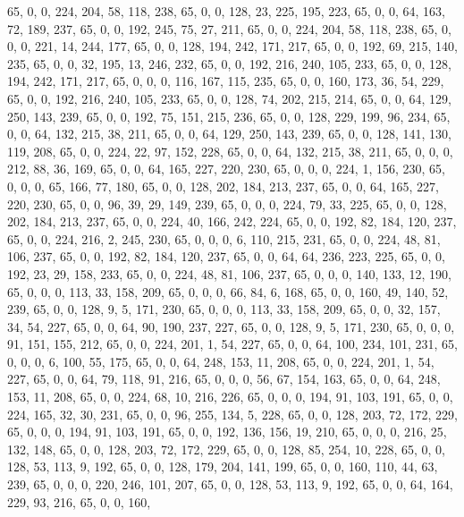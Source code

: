 \begin{DoxyCode}
       65, 0, 0, 224, 204, 58, 118, 238, 65, 0, 0, 128, 23, 225, 195, 223, 65, 0, 0, 64, 163, 72, 189, 237, 65, 0,
       0, 192, 245, 75, 27, 211, 65, 0, 0, 224, 204, 58, 118, 238, 65, 0, 0, 0, 221, 14, 244, 177, 65, 0, 0, 128,
       194, 242, 171, 217, 65, 0, 0, 192, 69, 215, 140, 235, 65, 0, 0, 32, 195, 13, 246, 232, 65, 0, 0, 192, 216,
       240, 105, 233, 65, 0, 0, 128, 194, 242, 171, 217, 65, 0, 0, 0, 116, 167, 115, 235, 65, 0, 0, 160, 173, 36, 54,
       229, 65, 0, 0, 192, 216, 240, 105, 233, 65, 0, 0, 128, 74, 202, 215, 214, 65, 0, 0, 64, 129, 250, 143, 239,
       65, 0, 0, 192, 75, 151, 215, 236, 65, 0, 0, 128, 229, 199, 96, 234, 65, 0, 0, 64, 132, 215, 38, 211, 65, 0,
       0, 64, 129, 250, 143, 239, 65, 0, 0, 128, 141, 130, 119, 208, 65, 0, 0, 224, 22, 97, 152, 228, 65, 0, 0,
       64, 132, 215, 38, 211, 65, 0, 0, 0, 212, 88, 36, 169, 65, 0, 0, 64, 165, 227, 220, 230, 65, 0, 0, 0, 224, 1,
       156, 230, 65, 0, 0, 0, 65, 166, 77, 180, 65, 0, 0, 128, 202, 184, 213, 237, 65, 0, 0, 64, 165, 227, 220, 230,
       65, 0, 0, 96, 39, 29, 149, 239, 65, 0, 0, 0, 224, 79, 33, 225, 65, 0, 0, 128, 202, 184, 213, 237, 65, 0, 0,
       224, 40, 166, 242, 224, 65, 0, 0, 192, 82, 184, 120, 237, 65, 0, 0, 224, 216, 2, 245, 230, 65, 0, 0, 0, 6,
       110, 215, 231, 65, 0, 0, 224, 48, 81, 106, 237, 65, 0, 0, 192, 82, 184, 120, 237, 65, 0, 0, 64, 64, 236,
       223, 225, 65, 0, 0, 192, 23, 29, 158, 233, 65, 0, 0, 224, 48, 81, 106, 237, 65, 0, 0, 0, 140, 133, 12, 190, 65,
       0, 0, 0, 113, 33, 158, 209, 65, 0, 0, 0, 66, 84, 6, 168, 65, 0, 0, 160, 49, 140, 52, 239, 65, 0, 0, 128, 9,
       5, 171, 230, 65, 0, 0, 0, 113, 33, 158, 209, 65, 0, 0, 32, 157, 34, 54, 227, 65, 0, 0, 64, 90, 190, 237,
       227, 65, 0, 0, 128, 9, 5, 171, 230, 65, 0, 0, 0, 91, 151, 155, 212, 65, 0, 0, 224, 201, 1, 54, 227, 65, 0, 0,
       64, 100, 234, 101, 231, 65, 0, 0, 0, 6, 100, 55, 175, 65, 0, 0, 64, 248, 153, 11, 208, 65, 0, 0, 224, 201,
       1, 54, 227, 65, 0, 0, 64, 79, 118, 91, 216, 65, 0, 0, 0, 56, 67, 154, 163, 65, 0, 0, 64, 248, 153, 11, 208,
       65, 0, 0, 224, 68, 10, 216, 226, 65, 0, 0, 0, 194, 91, 103, 191, 65, 0, 0, 224, 165, 32, 30, 231, 65, 0, 0,
       96, 255, 134, 5, 228, 65, 0, 0, 128, 203, 72, 172, 229, 65, 0, 0, 0, 194, 91, 103, 191, 65, 0, 0, 192, 136,
       156, 19, 210, 65, 0, 0, 0, 216, 25, 132, 148, 65, 0, 0, 128, 203, 72, 172, 229, 65, 0, 0, 128, 85, 254, 10,
       228, 65, 0, 0, 128, 53, 113, 9, 192, 65, 0, 0, 128, 179, 204, 141, 199, 65, 0, 0, 160, 110, 44, 63, 239, 65,
       0, 0, 0, 220, 246, 101, 207, 65, 0, 0, 128, 53, 113, 9, 192, 65, 0, 0, 64, 164, 229, 93, 216, 65, 0, 0, 160,

\end{DoxyCode}
